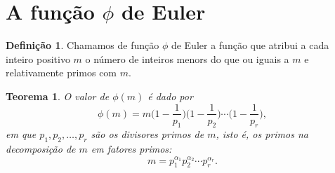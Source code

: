 \documentclass[]{book}
\newtheorem{theorem}{Teorema}[chapter]
\theoremstyle{definition}
\newtheorem{definition}{Definição}[chapter]
\theoremstyle{definition}
\theoremstyle{definition}
\theoremstyle{remark}
\begin{document}
\hypertarget{a-funuxe7uxe3o-phi-de-euler}{%
\section{\texorpdfstring{A função \(\phi\) de Euler}{A função \textbackslash{}phi de Euler}}\label{a-funuxe7uxe3o-phi-de-euler}}

\begin{definition}
\protect\hypertarget{def:defPhiEuler}{}{\label{def:defPhiEuler} }Chamamos de função \(\phi\) de Euler a função que atribui a cada inteiro positivo \(m\) o número de inteiros menors do que ou iguais a \(m\) e relativamente primos com \(m\).
\end{definition}

\begin{theorem}
\protect\hypertarget{thm:teoValorPhi}{}{\label{thm:teoValorPhi} }O valor de \(\phi(m)\) é dado por
\[\phi(m) = m\bigg(1 - \frac{1}{p_1}\bigg)\bigg(1 - \frac{1}{p_2}\bigg)\cdots\bigg(1 - \frac{1}{p_r}\bigg),\]
em que \(p_1, p_2, \ldots, p_r\) são os divisores primos de \(m\), isto é, os primos na decomposição de \(m\) em fatores primos:
\[m = p_1^{\alpha_1}p_2^{\alpha_2}\cdots p_r^{\alpha_r}.\]
\end{theorem}
\end{document}
